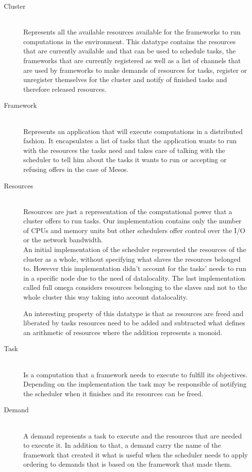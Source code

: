 \documentclass{report}                     %
\begin{document}
\begin{description}
  \item[Cluster] \hfill \\
  Represents all the available resources available for the frameworks
  to run computations in the environment. This datatype contains the
  resources that are currently available and that can be used to
  schedule tasks, the frameworks that are currently registered as well
  as a list of channels that are used by frameworks to make demands of
  resources for tasks, register or unregister themselves for the
  cluster and notify of finished tasks and therefore released resources.
  \item[Framework] \hfill \\
  Represents an application that will execute computations
  in a distributed fashion. It encapsulates a list of tasks that the application
  wants to run with the resources the tasks need and takes care of
  talking with the scheduler to tell him about the tasks it wants to
  run or accepting or refusing offers in the case of Mesos.
  \item[Resources] \hfill \\
  Resources are just a representation of the computational power that
  a cluster offers to run tasks. Our implementation contains only the
  number of CPUs and memory units but other schedulers offer control
  over the I/O or the network bandwidth. \\

  An initial implementation of the scheduler represented the resources
  of the cluster as a whole, without specifying what slaves the
  resources belonged to. However this implementation didn't account
  for the tasks' needs to run in a specific node due to the need of
  datalocality. The last implementation called full omega considers
  resources belonging to the slaves and not to the whole cluster this
  way taking into account datalocality.
  
  An interesting property of this datatype is that as resources are
  freed and liberated by tasks resources need to be added and
  subtracted what defines an arithmetic of resources where the
  addition represents a monoid.
  \item[Task] \hfill \\
  Is a computation that a framework needs to execute to fulfill its
  objectives. Depending on the implementation the task may be
  responsible of notifying the scheduler when it finishes and its
  resources can be freed.
  \item[Demand] \hfill \\
  A demand represents a task to execute and the resources that are
  needed to execute it. In addition to that, a demand  carry the
  name of the framework that created it what is useful when the
  scheduler needs to apply ordering to demands that is based on the
  framework that made them.

\end{description}
\end{document}
